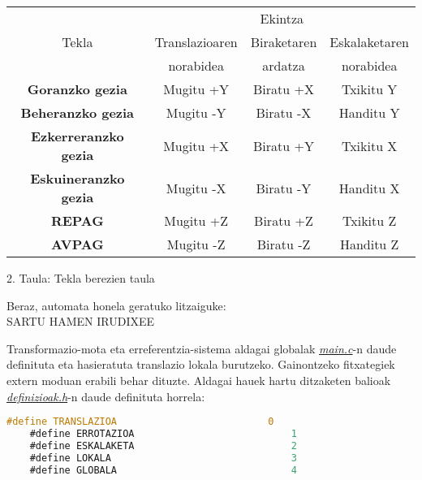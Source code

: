 \documentclass[12pt]{article}
\newcommand{\fitxategi}[1] {\underline{\textit{#1}}}
\begin{document}
\begin{center}

\begin{tabular}{|c|c|c|c|}
																			\hline
	\multirow{3}{*}{Tekla}		& \multicolumn{3}{|c|}{Ekintza} 		\\	\cline{2-4}
	& Translazioaren  & Biraketaren  & Eskalaketaren 					\\ 
	&  norabidea &  ardatza &  norabidea 								\\	\hline
	\textbf{Goranzko gezia}		 &  Mugitu +Y & Biratu +X & Txikitu Y	\\	\hline
	\textbf{Beheranzko gezia}	 &  Mugitu -Y & Biratu -X & Handitu Y	\\	\hline
	\textbf{Ezkerreranzko gezia}&  Mugitu +X & Biratu +Y & Txikitu X	\\	\hline
	\textbf{Eskuineranzko gezia}&  Mugitu -X & Biratu -Y & Handitu X	\\	\hline
	\textbf{REPAG}				 &  Mugitu +Z & Biratu +Z & Txikitu Z	\\	\hline
	\textbf{AVPAG}				 &  Mugitu -Z & Biratu -Z & Handitu Z	\\	\hline
\end{tabular}

\vspace{0.3cm}
2. Taula: Tekla berezien taula
\end{center}


Beraz, automata honela geratuko litzaiguke:\\

SARTU HAMEN IRUDIXEE



Transformazio-mota eta erreferentzia-sistema aldagai globalak \fitxategi{main.c}-n daude definituta eta hasieratuta translazio lokala burutzeko. Gainontzeko fitxategiek extern moduan erabili behar dituzte. Aldagai hauek hartu ditzaketen balioak \fitxategi{definizioak.h}-n daude definituta horrela:

\begin{center}
	\begin{lstlisting}[language=C, basicstyle=\footnotesize]
	#define TRANSLAZIOA                          0
	#define ERROTAZIOA                           1
	#define ESKALAKETA                           2
	#define LOKALA                               3
	#define GLOBALA                              4
	\end{lstlisting}
\end{center}
\end{document}
